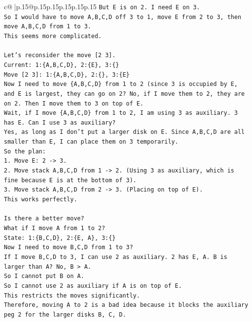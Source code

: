 \documentclass{article}
\begin{document}
{\begin{supertabular}{c@{$\;$}|p{.15\linewidth}@{}p{.15\linewidth}p{.15\linewidth}p{.15\linewidth}p{.15\linewidth}p{.15\linewidth}}
{{{\texttt{But E is on 2. I need E on 3.} \\
\texttt{So I would have to move A,B,C,D off 3 to 1, move E from 2 to 3, then move A,B,C,D from 1 to 3.} \\
\texttt{This seems more complicated.} \\
\\ 
\texttt{Let's reconsider the move {[}2 3{]}.} \\
\texttt{Current: 1:\{A,B,C,D\}, 2:\{E\}, 3:\{\}} \\
\texttt{Move {[}2 3{]}: 1:\{A,B,C,D\}, 2:\{\}, 3:\{E\}} \\
\texttt{Now I need to move \{A,B,C,D\} from 1 to 2 (since 3 is occupied by E, and E is largest, they can go on 2? No, if I move them to 2, they are on 2. Then I move them to 3 on top of E.} \\
\texttt{Wait, if I move \{A,B,C,D\} from 1 to 2, I am using 3 as auxiliary. 3 has E. Can I use 3 as auxiliary?} \\
\texttt{Yes, as long as I don't put a larger disk on E. Since A,B,C,D are all smaller than E, I can place them on 3 temporarily.} \\
\texttt{So the plan:} \\
\texttt{1. Move E: 2 {-}> 3.} \\
\texttt{2. Move stack A,B,C,D from 1 {-}> 2. (Using 3 as auxiliary, which is fine because E is at the bottom of 3).} \\
\texttt{3. Move stack A,B,C,D from 2 {-}> 3. (Placing on top of E).} \\
\texttt{This works perfectly.} \\
\\ 
\texttt{Is there a better move?} \\
\texttt{What if I move A from 1 to 2?} \\
\texttt{State: 1:\{B,C,D\}, 2:\{E, A\}, 3:\{\}} \\
\texttt{Now I need to move B,C,D from 1 to 3?} \\
\texttt{If I move B,C,D to 3, I can use 2 as auxiliary. 2 has E, A. B is larger than A? No, B > A.} \\
\texttt{So I cannot put B on A.} \\
\texttt{So I cannot use 2 as auxiliary if A is on top of E.} \\
\texttt{This restricts the moves significantly.} \\
\texttt{Therefore, moving A to 2 is a bad idea because it blocks the auxiliary peg 2 for the larger disks B, C, D.} \\
}}}
\end{supertabular}}
\end{document}
